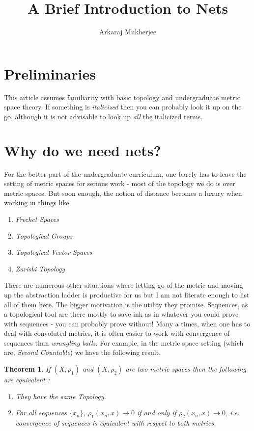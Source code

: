 \documentclass[12pt,english]{article}
\title{\textbf{A Brief Introduction to Nets}}
\author{Arkaraj Mukherjee}
\newtheorem{theorem}{Theorem}[section]
\begin{document}
\maketitle
\section*{Preliminaries}
This article assumes familiarity with basic topology and undergraduate metric space theory. If something is \textit{italicized} then you can probably look it up on the go, although it is not advisable to look up \textit{all} the italicized terms. 
\section*{Why do we need nets?}
For the better part of the undergraduate curriculum, one barely has to leave the setting of metric spaces for serious work - most of the topology we do is over metric spaces. 
But soon enough, the notion of distance becomes a luxury when working in things like
\begin{enumerate}[label=$\ast$]
    \item \textit{Frechet Spaces} 
    \item \textit{Topological Groups}
    \item \textit{Topological Vector Spaces}
    \item \textit{Zariski Topology}
\end{enumerate}
There are numerous other situations where letting go of the metric and moving up the abstraction ladder is productive for us but I am not literate enough to list all of them here. 
The bigger motivation is the utility they promise. 
Sequences, as a topological tool are there mostly to save ink as in whatever you could prove with sequences - you can probably prove without! Many a times, when one has to deal with convoluted metrics, it is often easier to work with convergence of sequences than \textit{wrangling balls.} 
For example, in the metric space setting (which are, \textit{Second Countable}) we have the following result. 
\begin{theorem}
    If $(X,\rho_1)$ and $(X,\rho_2)$ are two metric spaces then the following are equivalent : 
    \begin{enumerate}[label=\alph*.]
        \item They have the same Topology.
        \item For all sequences $\{x_n\}$, $\rho_1(x_n,x)\to 0$ if and only if $\rho_2(x_n,x)\to 0$, i.e. convergence of sequences is equivalent with respect to both metrics.
    \end{enumerate}
\end{theorem}
\end{document}
